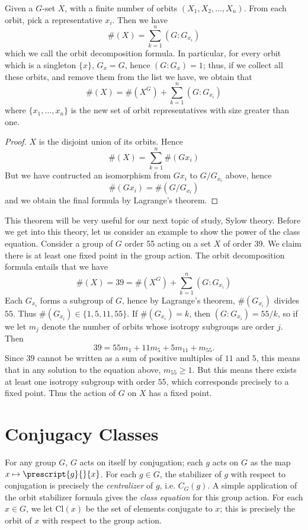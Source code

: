 \begin{corollary} 
    Given a $G$-set $X$, with a finite number of orbits $(X_1, X_2, \dots, X_n)$. From each orbit, pick a representative $x_i$. Then we have
    \[ \#(X) = \sum_{k=1}^n (G:G_{x_i}) \]
    which we call the orbit decomposition formula. In particular, for every orbit which is a singleton $\{ x \}$, $G_x = G$, hence $(G:G_x) = 1$; thus, if we collect all these orbits, and remove them from the list we have, we obtain that
    \[ \#(X) = \#(X^G) + \sum_{k=1}^{n} (G:G_{x_i}) \]
    where $\{ x_1, \dots, x_n \}$ is the new set of orbit representatives with size greater than one.
\end{corollary}
\begin{proof}
    $X$ is the disjoint union of its orbits. Hence
    \[ \#(X) = \sum_{k=1}^n \#(Gx_i) \]
    But we have contructed an isomorphism from $Gx_i$ to $G/G_{x_i}$ above, hence
    \[ \#(Gx_i) = \#(G/G_{x_i}) \]
    and we obtain the final formula by Lagrange's theorem.
\end{proof}

This theorem will be very useful for our next topic of study, Sylow theory. Before we get into this theory, let us consider an example to show the power of the class equation. Consider a group of $G$ order 55 acting on a set $X$ of order 39. We claim there is at least one fixed point in the group action. The orbit decomposition formula entails that we have
%
\[ \#(X) = 39 = \#(X^G) + \sum_{k=1}^n (G:G_{x_i}) \]
%
Each $G_{x_i}$ forms a subgroup of $G$, hence by Lagrange's theorem, $\#(G_{x_i})$ divides $55$. Thus $\#(G_{x_i}) \in \{ 1, 5, 11, 55 \}$. If $\#(G_{x_i}) = k$, then $(G:G_{x_i}) = 55/k$, so if we let $m_j$ denote the number of orbits whose isotropy subgroups are order $j$. Then
%
\[ 39 = 55m_1 + 11m_5 + 5m_{11} + m_{55}. \]
%
Since $39$ cannot be written as a sum of positive multiples of $11$ and $5$, this means that in any solution to the equation above, $m_{55} \geq 1$. But this means there exists at least one isotropy subgroup with order $55$, which corresponds precisely to a fixed point. Thus the action of $G$ on $X$ has a  fixed point.

\section{Conjugacy Classes}

For any group $G$, $G$ acts on itself by conjugation; each $g$ acts on $G$ as the map $x \mapsto \prescript{g}{}{x}$. For each $g \in G$, the stabilizer of $g$ with respect to conjugation is precisely the \emph{centralizer} of $g$, i.e. $C_G(g)$. A simple application of the orbit stabilizer formula gives the \emph{class equation} for this group action. For each $x \in G$, we let $\text{Cl}(x)$ be the set of elements conjugate to $x$; this is precisely the orbit of $x$ with respect to the group action.

